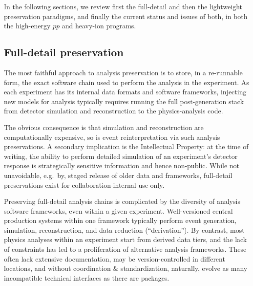 \documentclass[11pt]{article}
\begin{document}
In the following sections, we review first the full-detail and then the lightweight preservation paradigms, and finally the current status and issues of both, in both the high-energy $pp$ and heavy-ion programs.




\subsection{Full-detail preservation} \label{sec:analysisPreservation}

The most faithful approach to analysis preservation is to store, in a re-runnable form, the exact software chain used to perform the analysis in the experiment. As each experiment has its internal data formats and software frameworks, injecting new models for analysis typically requires running the full post-generation stack from detector simulation and reconstruction to the physics-analysis code.

The obvious consequence is that simulation and reconstruction are computationally expensive, so is event reinterpretation via such analysis preservations. A secondary implication is the Intellectual Property: at the time of writing, the ability to perform detailed simulation of an experiment's detector response is strategically sensitive information and hence non-public. While not unavoidable, e.g.~by, staged release of older data and frameworks, full-detail preservations exist for collaboration-internal use only.

Preserving full-detail analysis chains is complicated by the diversity of analysis software frameworks, even within a given experiment. Well-versioned central production systems within one framework typically perform event generation, simulation, reconstruction, and data reduction (``derivation''). By contrast, most physics analyses within an experiment start from derived data tiers, and the lack of constraints has led to a proliferation of alternative analysis frameworks. These often lack extensive documentation, may be version-controlled in different locations, and without coordination \& standardization, naturally, evolve as many incompatible technical interfaces as there are packages.
\end{document}
